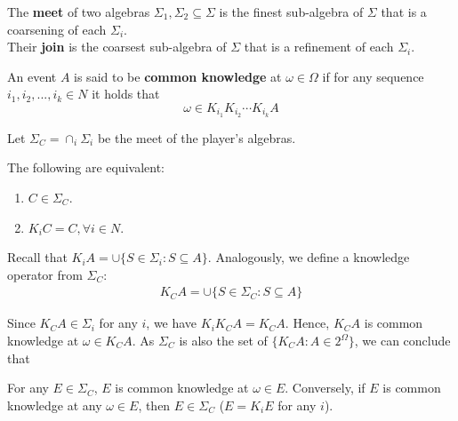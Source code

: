 \documentclass[11pt]{elegantbook}
\begin{document}
\begin{definition}
    \normalfont
    The \textbf{meet} of two algebras $\Sigma_1, \Sigma_2 \subseteq \Sigma$ is the finest sub-algebra of $\Sigma$ that is a coarsening of each $\Sigma_i$.\\
    Their \textbf{join} is the coarsest sub-algebra of $\Sigma$ that is a refinement of each $\Sigma_i$.
\end{definition}

\begin{definition}
    \normalfont
    An event $A$ is said to be \textbf{common knowledge} at $\omega\in\Omega$ if for any sequence $i_1,i_2,...,i_k\in N$ it holds that $$\omega\in K_{i_1}K_{i_2}\cdots K_{i_k}A$$
\end{definition}
Let $\Sigma_C=\cap_i\Sigma_i$ be the meet of the player's algebras.
\begin{proposition}
    The following are equivalent:
    \begin{enumerate}
        \item $C\in\Sigma_C$.
        \item $K_iC=C,\forall i\in N$.
    \end{enumerate}
\end{proposition}
\begin{definition}[$K_C$]
    \normalfont
    Recall that $K_i A=\cup\{S\in\Sigma_i:S\subseteq A\}$. Analogously, we define a knowledge operator from $\Sigma_C$:
    \begin{equation}
        \begin{aligned}
            K_CA=\cup\{S\in\Sigma_C:S\subseteq A\}
        \end{aligned}
        \nonumber
    \end{equation}
\end{definition}
Since $K_C A\in\Sigma_i$ for any $i$, we have $K_i K_C A=K_C A$. Hence, $K_C A$ is common knowledge at $\omega\in K_C A$. As $\Sigma_C$ is also the set of $\{K_C A: A\in 2^\Omega\}$, we can conclude that
\begin{proposition}
    For any $E\in\Sigma_C$, $E$ is common knowledge at $\omega\in E$. Conversely, if $E$ is common knowledge at any $\omega \in E$, then $E\in\Sigma_C$ ($E = K_iE$ for any $i$).
\end{proposition}
\end{document}
